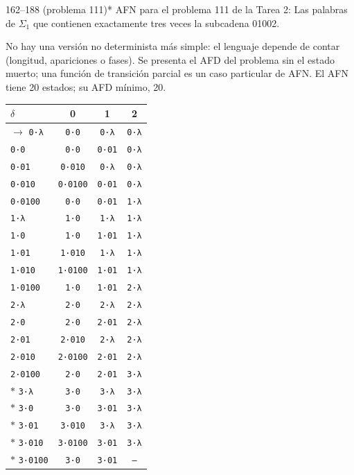 \documentclass[11pt]{article}
\begin{document}
\begin{ejercicio}{162--188 (problema 111)}{*}
AFN para el problema 111 de la Tarea 2: Las palabras de $\Sigma_1$ que contienen exactamente tres veces la subcadena 01002.
\end{ejercicio}
\proc No hay una versión no determinista más simple: el lenguaje depende de contar (longitud, apariciones o fases). Se presenta el AFD del problema sin el estado muerto; una función de transición parcial es un caso particular de AFN. El AFN tiene 20 estados; su AFD mínimo, 20.
\begin{center}\small\begin{tabular}{lccc}\toprule
$\delta$ & 0 & 1 & 2 \\\midrule
$\to$ \texttt{0·λ} & \texttt{0·0} & \texttt{0·λ} & \texttt{0·λ} \\
 \texttt{0·0} & \texttt{0·0} & \texttt{0·01} & \texttt{0·λ} \\
 \texttt{0·01} & \texttt{0·010} & \texttt{0·λ} & \texttt{0·λ} \\
 \texttt{0·010} & \texttt{0·0100} & \texttt{0·01} & \texttt{0·λ} \\
 \texttt{0·0100} & \texttt{0·0} & \texttt{0·01} & \texttt{1·λ} \\
 \texttt{1·λ} & \texttt{1·0} & \texttt{1·λ} & \texttt{1·λ} \\
 \texttt{1·0} & \texttt{1·0} & \texttt{1·01} & \texttt{1·λ} \\
 \texttt{1·01} & \texttt{1·010} & \texttt{1·λ} & \texttt{1·λ} \\
 \texttt{1·010} & \texttt{1·0100} & \texttt{1·01} & \texttt{1·λ} \\
 \texttt{1·0100} & \texttt{1·0} & \texttt{1·01} & \texttt{2·λ} \\
 \texttt{2·λ} & \texttt{2·0} & \texttt{2·λ} & \texttt{2·λ} \\
 \texttt{2·0} & \texttt{2·0} & \texttt{2·01} & \texttt{2·λ} \\
 \texttt{2·01} & \texttt{2·010} & \texttt{2·λ} & \texttt{2·λ} \\
 \texttt{2·010} & \texttt{2·0100} & \texttt{2·01} & \texttt{2·λ} \\
 \texttt{2·0100} & \texttt{2·0} & \texttt{2·01} & \texttt{3·λ} \\
$*$ \texttt{3·λ} & \texttt{3·0} & \texttt{3·λ} & \texttt{3·λ} \\
$*$ \texttt{3·0} & \texttt{3·0} & \texttt{3·01} & \texttt{3·λ} \\
$*$ \texttt{3·01} & \texttt{3·010} & \texttt{3·λ} & \texttt{3·λ} \\
$*$ \texttt{3·010} & \texttt{3·0100} & \texttt{3·01} & \texttt{3·λ} \\
$*$ \texttt{3·0100} & \texttt{3·0} & \texttt{3·01} & \texttt{--} \\
\bottomrule\end{tabular}\end{center}
\end{document}
